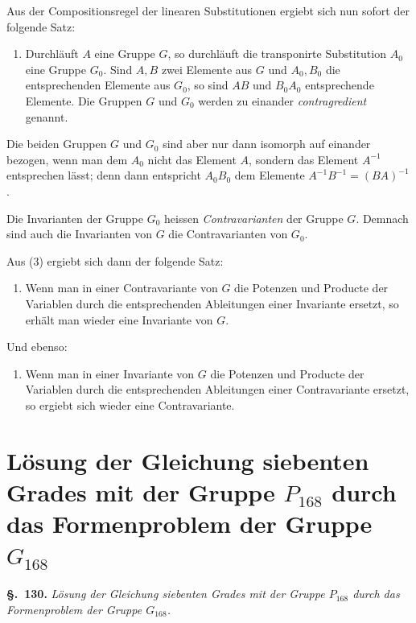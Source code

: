 \documentclass[12pt,a4paper]{article}
\theoremstyle{definition}
\begin{document}
Aus der Compositionsregel der linearen Substitutionen ergiebt sich nun sofort der folgende Satz:

\begin{enumerate}[label=\arabic*., resume]
\item Durchläuft $A$ eine Gruppe $G$, so durchläuft die transponirte Substitution $A_0$ eine Gruppe $G_0$. Sind $A,B$ zwei Elemente aus $G$ und $A_0,B_0$ die entsprechenden Elemente aus $G_0$, so sind $AB$ und $B_0A_0$ entsprechende Elemente. Die Gruppen $G$ und $G_0$ werden zu einander \emph{contragredient} genannt.
\end{enumerate}

Die beiden Gruppen $G$ und $G_0$ sind aber nur dann isomorph auf einander bezogen, wenn man dem $A_0$ nicht das Element $A$, sondern das Element $A^{-1}$ entsprechen lässt; denn dann entspricht $A_0B_0$ dem Elemente $A^{-1}B^{-1}=(BA)^{-1}$.

Die Invarianten der Gruppe $G_0$ heissen \emph{Contravarianten} der Gruppe $G$. Demnach sind auch die Invarianten von $G$ die Contravarianten von $G_0$.

Aus (3) ergiebt sich dann der folgende Satz:

\begin{enumerate}[label=\arabic*., resume]
\item Wenn man in einer Contravariante von $G$ die Potenzen und Producte der Variablen durch die entsprechenden Ableitungen einer Invariante ersetzt, so erhält man wieder eine Invariante von $G$.
\end{enumerate}

Und ebenso:

\begin{enumerate}[label=\arabic*., resume]
\item Wenn man in einer Invariante von $G$ die Potenzen und Producte der Variablen durch die entsprechenden Ableitungen einer Contravariante ersetzt, so ergiebt sich wieder eine Contravariante.
\end{enumerate}

\newpage
\section{Lösung der Gleichung siebenten Grades mit der Gruppe $P_{168}$ durch das Formenproblem der Gruppe $G_{168}$}\label{sec:130}

\noindent\textbf{\S.~130.}\quad
\textit{Lösung der Gleichung siebenten Grades mit der Gruppe $P_{168}$ durch das Formenproblem der Gruppe $G_{168}$.}\par\medskip
\end{document}
